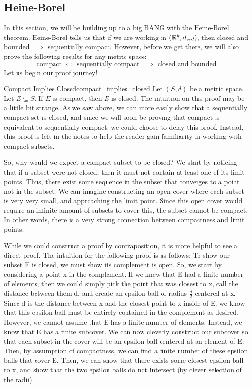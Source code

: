 \subsection{Heine-Borel}
In this section, we will be building up to a big BANG with the Heine-Borel theorem. Heine-Borel tells us that if we are working in \(({\mathbb R}^k, d_{std})\), then closed and bounded \(\implies\) sequentially compact. However, before we get there, we will also prove the following results for any metric space:
	\begin{equation*}
  		\textrm{compact \(\iff\) sequentially compact \(\implies\) closed and bounded}
	\end{equation*}
Let us begin our proof journey!
\begin{thm}{Compact Implies Closed}{compact_implies_closed}
Let \((S, d)\) be a metric space. Let \(E \subseteq S\). \newline 
If \(E\) is compact, then \(E\) is closed.\newline
The intuition on this proof may be a little bit strange. As we saw above, we can more easily show that a sequentially compact set is closed, and since we will soon be proving that compact is equivalent to sequentially compact, we could choose to delay this proof. Instead, this proof is left in the notes to help the reader gain familiarity in working with compact subsets. \newline 

So, why would we expect a compact subset to be closed? We start by noticing that if a subset were not closed, then it must not contain at least one of its limit points. Thus, there exist some sequence in the subset that converges to a point not in the subset. We can imagine constructing an open cover where each subset is very very small, and approaching the limit point. Since this open cover would require an infinite amount of subsets to cover this, the subset cannot be compact. In other words, there is a very strong connection between compactness and limit points.\newline 

While we could construct a proof by contraposition, it is more helpful to see a direct proof. The intuition for the following proof is as follows: To show our subset E is closed, we must show its complement is open. So, we start by considering a point x in the complement. If we knew that E had a finite number of elements, then we could simply pick the point that was closest to x, call the distance between them d, and create an epsilon ball of radius \(\frac{d}{2}\) centered at x. Since d is the distance between x and the closest point to x inside of E, we know that this epsilon ball must be entirely contained in the complement as desired. However, we cannot assume that E has a finite number of elements. Instead, we know that E has a finite subcover. We can now cleverly construct our subcover so that each subset in the cover will be an epsilon ball centered at an element of E. Then, by assumption of compactness, we can find a finite number of these epsilon balls that cover E. Then, we can show that there exists some closest epsilon ball to x, and show that the two epsilon balls do not intersect (by clever selection of the radii). \newline 


\end{thm}
